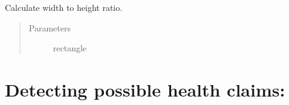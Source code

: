 \documentclass[letterpaper,10pt,english]{sphinxmanual}
\begin{document}

\begin{fulllineitems}
\label{\detokenize{api:color_filter2.ratio}}
Calculate width to height ratio.
\begin{quote}\begin{description}
\item[{Parameters}] \leavevmode
{} \textendash{} rectangle

\end{description}\end{quote}

\end{fulllineitems}



\section{Detecting possible health claims:}
\label{\detokenize{api:module-health_claims}}\label{\detokenize{api:detecting-possible-health-claims}}
\end{document}
